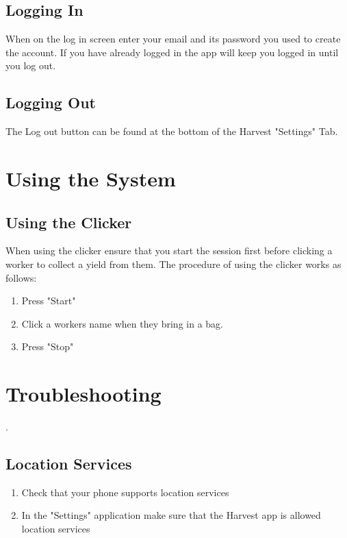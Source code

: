\documentclass[11pt]{article}
\begin{document}
\subsection{Logging In}
When on the log in screen enter your email and its password you used to create the account. If you have already logged in the app will keep you logged in until you log out.

\subsection{Logging Out}
The Log out button can be found at the bottom of the Harvest "Settings" Tab.

\newpage
\section{Using the System}

\subsection{Using the Clicker}
When using the clicker ensure that you start the session first before clicking a worker to collect a yield from them. The procedure of using the clicker works as follows:

\begin{enumerate}
\item Press "Start"
\item Click a workers name when they bring in a bag.
\item Press "Stop"
\end{enumerate}

\newpage
\section{Troubleshooting}.

\subsection{Location Services}
\begin{enumerate}
\item Check that your phone supports location services
\item In the "Settings" application make sure that the Harvest app is allowed location services 
\end{enumerate}
\end{document}
